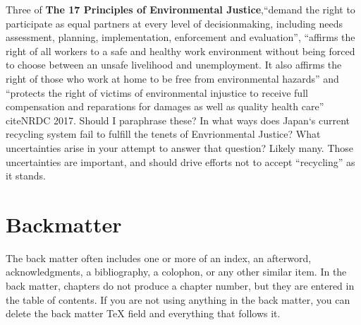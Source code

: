 \documentclass{book}\usepackage{knitr}
\begin{document}
Three of \textbf{The 17 Principles of Environmental Justice},``demand the right to
participate as equal partners at every level of decisionmaking, including needs assessment, planning, implementation, enforcement and evaluation'', ``affirms the right of all workers
to a safe and healthy work environment without being forced to choose between an unsafe livelihood and unemployment. It also affirms the right of those who work at home to be free from environmental hazards'' and ``protects the right of victims of environmental injustice to receive full compensation and reparations for damages as well as quality health care'' citeNRDC 2017. Should I paraphrase these? In what ways does Japan`s current recycling system fail to fulfill the tenets of Envrionmental Justice? What uncertainties arise in your attempt to answer that question? Likely many. Those uncertainties are important, and should drive efforts not to accept ``recycling'' as it stands. 



\backmatter

\part{Backmatter}

The back matter often includes one or more of an index, an afterword, acknowledgments, a bibliography, a colophon, or any other similar item. In the back matter, chapters do not produce a chapter number, but they are entered in the table of contents. If you are not using anything in the back matter, you can delete the back matter TeX field and everything that follows it.

\printglossary

\renewcommand\bibname{References}
\setlength{\bibsep}{2\baselineskip}
\setlength\bibindent{.5in}


\end{document}
